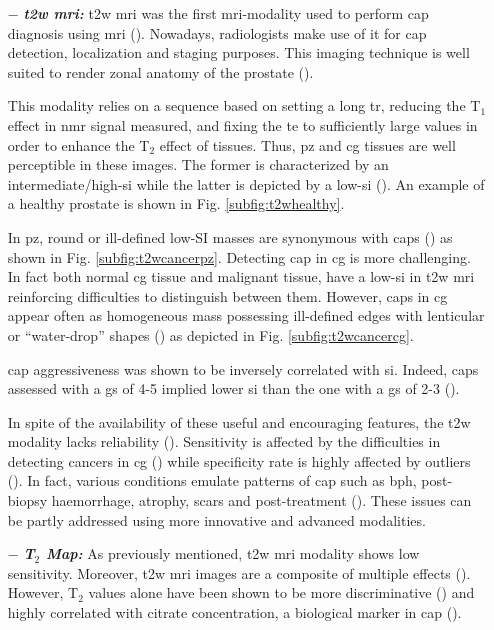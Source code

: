 \begin{enumerate}[leftmargin=*]
\item[$-$] \textbf{\textit{\ac{t2w} \ac{mri}:}} \ac{t2w} \ac{mri} was the first \ac{mri}-modality used to perform \ac{cap} diagnosis using \ac{mri} (\cite{Hricak1983}). Nowadays, radiologists make use of it for \ac{cap} detection, localization and staging purposes. This imaging technique is well suited to render zonal anatomy of the prostate (\cite{Barentsz2012}). 

This modality relies on a sequence based on setting a long \ac{tr}, reducing the T$_1$ effect in \ac{nmr} signal measured, and fixing the \ac{te} to sufficiently large values in order to enhance the T$_2$ effect of tissues. Thus, \ac{pz} and \ac{cg} tissues are well perceptible in these images. The former is characterized by an intermediate/high-\ac{si} while the latter is depicted by a low-\ac{si} (\cite{Hricak1987}). An example of a healthy prostate is shown in Fig. \ref{subfig:t2whealthy}.

In \ac{pz}, round or ill-defined low-SI masses are synonymous with \acp{cap} (\cite{Hricak1983}) as shown in Fig. \ref{subfig:t2wcancerpz}. Detecting \ac{cap} in \ac{cg} is more challenging. In fact both normal \ac{cg} tissue and malignant tissue, have a low-\ac{si} in \ac{t2w} \ac{mri} reinforcing difficulties to distinguish between them. However, \acp{cap} in \ac{cg} appear often as homogeneous mass possessing ill-defined edges with lenticular or ``water-drop'' shapes (\cite{Akin2006, Barentsz2012}) as depicted in Fig. \ref{subfig:t2wcancercg}. 

\ac{cap} aggressiveness was shown to be inversely correlated with \ac{si}. Indeed, \acp{cap} assessed with a \ac{gs} of 4-5 implied lower \ac{si} than the one with a \ac{gs} of 2-3 (\cite{Wang2008}).

In spite of the availability of these useful and encouraging features, the \ac{t2w} modality lacks reliability (\cite{Kirkham2006,Hoeks2011}). Sensitivity is affected by the difficulties in detecting cancers in \ac{cg} (\cite{Kirkham2006}) while specificity rate is highly affected by outliers (\cite{Barentsz2012}). In fact, various conditions emulate patterns of \ac{cap} such as \ac{bph}, post-biopsy haemorrhage, atrophy, scars and post-treatment (\cite{Hricak1987,Quint1991,Scheidler1999,Cruz2002,Barentsz2012}). These issues can be partly addressed using more innovative and advanced modalities.

\item[$-$] \textbf{\textit{T$_2$ Map:}} As previously mentioned, \ac{t2w} \ac{mri} modality shows low sensitivity. Moreover, \ac{t2w} \ac{mri} images are a composite of multiple effects (\cite{Hegde2013}). However, T$_2$ values alone have been shown to be more discriminative (\cite{Liu2011}) and highly correlated with citrate concentration, a biological marker in \ac{cap} (\cite{Liney1996,Liney1997}). 


\end{enumerate}
